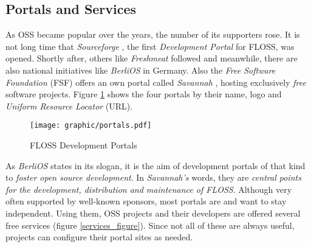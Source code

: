 %
%
%
%
%
%
%

\subsection{Portals and Services}
\label{portals_and_services_heading}

As OSS became popular over the years, the number of its supporters rose. It is
not long time that \emph{Sourceforge} \cite{sourceforge}, the first
\emph{Development Portal} for FLOSS, was opened. Shortly after, others like
\emph{Freshmeat} \cite{freshmeat} followed and meanwhile, there are also
national initiatives like \emph{BerliOS} \cite{berlios} in Germany. Also the
\emph{Free Software Foundation} (FSF) offers an own portal called
\emph{Savannah} \cite{savannah}, hosting exclusively \emph{free} \cite{gnu}
software projects. Figure \ref{portals_figure} shows the four portals by their
name, logo and \emph{Uniform Resource Locator} (URL).

\begin{figure}[ht]
    \begin{center}
        \texttt{[image: graphic/portals.pdf]}
        \caption{FLOSS Development Portals}
        \label{portals_figure}
    \end{center}
\end{figure}

As \emph{BerliOS} states in its slogan, it is the aim of development portals of
that kind to \textit{foster open source development}. In \emph{Savannah's}
words, they are \textit{central points for the development, distribution and
maintenance of FLOSS}. Although very often supported by well-known sponsors,
most portals are and want to stay independent. Using them, OSS projects and their
developers are offered several free services (figure \ref{services_figure}).
Since not all of these are always useful, projects can configure their portal
sites as needed.

